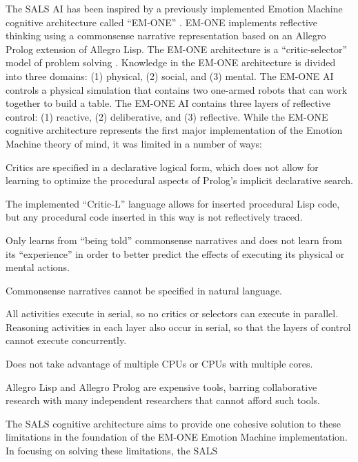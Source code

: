 The SALS AI has been inspired by a previously implemented Emotion
Machine cognitive architecture called ``EM-ONE'' \cite[]{singh:2005b}.
EM-ONE implements reflective thinking using a commonsense narrative
representation based on an Allegro Prolog extension of Allegro Lisp.
The EM-ONE architecture is a ``critic-selector'' model of problem
solving
\cite[]{sussman:1973,singh:2002a,singh:2004,singh:2005a,singh:2005b,minsky:2006,morgan:2009}.
Knowledge in the EM-ONE architecture is divided into three domains:
(1) physical, (2) social, and (3) mental.  The EM-ONE AI controls a
physical simulation that contains two one-armed robots that can work
together to build a table.  The EM-ONE AI contains three layers of
reflective control: (1) reactive, (2) deliberative, and (3)
reflective.  While the EM-ONE cognitive architecture represents the
first major implementation of the Emotion Machine theory of mind, it
was limited in a number of ways:
\begin{packed_enumerate}
\item{Critics are specified in a declarative logical form, which does
  not allow for learning to optimize the procedural aspects of
  Prolog's implicit declarative search.}
\item{The implemented ``Critic-L'' language allows for inserted
  procedural Lisp code, but any procedural code inserted in this way
  is not reflectively traced.}
\item{Only learns from ``being told'' commonsense narratives and does
  not learn from its ``experience'' in order to better predict the
  effects of executing its physical or mental actions.}
\item{Commonsense narratives cannot be specified in natural language.}
\item{All activities execute in serial, so no critics or selectors can
  execute in parallel.  Reasoning activities in each layer also occur
  in serial, so that the layers of control cannot execute
  concurrently.}
\item{Does not take advantage of multiple CPUs or CPUs with multiple
  cores.}
\item{Allegro Lisp and Allegro Prolog are expensive tools, barring
  collaborative research with many independent researchers that cannot
  afford such tools.}
\end{packed_enumerate}
The SALS cognitive architecture aims to provide one cohesive solution
to these limitations in the foundation of the EM-ONE Emotion Machine
implementation.  In focusing on solving these limitations, the SALS
